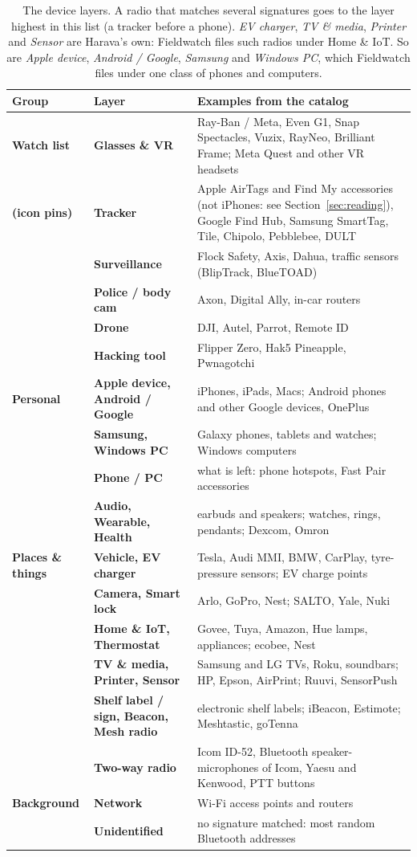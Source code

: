 \documentclass[10pt,a4paper]{article}
\begin{document}
\begin{table}[H]\small\centering
\begin{tabularx}{\textwidth}{>{\bfseries}p{2.4cm}>{\bfseries}p{2.9cm}X}
\toprule
Group & Layer & Examples from the catalog\\
\midrule
Watch list & Glasses \& VR & Ray-Ban / Meta, Even G1, Snap Spectacles, Vuzix, RayNeo, Brilliant Frame; Meta Quest and other VR headsets\\
(icon pins) & Tracker & Apple AirTags and Find My accessories (not iPhones: see Section~\ref{sec:reading}), Google Find Hub, Samsung SmartTag, Tile, Chipolo, Pebblebee, DULT\\
 & Surveillance & Flock Safety, Axis, Dahua, traffic sensors (BlipTrack, BlueTOAD)\\
 & Police / body cam & Axon, Digital Ally, in-car routers\\
 & Drone & DJI, Autel, Parrot, Remote ID\\
 & Hacking tool & Flipper Zero, Hak5 Pineapple, Pwnagotchi\\
\midrule
Personal & Apple device, Android / Google & iPhones, iPads, Macs; Android phones and other Google devices, OnePlus\\
 & Samsung, Windows PC & Galaxy phones, tablets and watches; Windows computers\\
 & Phone / PC & what is left: phone hotspots, Fast Pair accessories\\
 & Audio, Wearable, Health & earbuds and speakers; watches, rings, pendants; Dexcom, Omron\\
\midrule
Places \& things & Vehicle, EV charger & Tesla, Audi MMI, BMW, CarPlay, tyre-pressure sensors; EV charge points\\
 & Camera, Smart lock & Arlo, GoPro, Nest; SALTO, Yale, Nuki\\
 & Home \& IoT, Thermostat & Govee, Tuya, Amazon, Hue lamps, appliances; ecobee, Nest\\
 & TV \& media, Printer, Sensor & Samsung and LG TVs, Roku, soundbars; HP, Epson, AirPrint; Ruuvi, SensorPush\\
 & Shelf label / sign, Beacon, Mesh radio & electronic shelf labels; iBeacon, Estimote; Meshtastic, goTenna\\
 & Two-way radio & Icom ID-52, Bluetooth speaker-microphones of Icom, Yaesu and Kenwood, PTT buttons\\
\midrule
Background & Network & Wi-Fi access points and routers\\
 & Unidentified & no signature matched: most random Bluetooth addresses\\
\bottomrule
\end{tabularx}
\caption{The device layers. A radio that matches several signatures goes to the layer highest in this list (a tracker before a phone). \emph{EV charger}, \emph{TV \& media}, \emph{Printer} and \emph{Sensor} are Harava's own: Fieldwatch files such radios under Home \& IoT. So are \emph{Apple device}, \emph{Android / Google}, \emph{Samsung} and \emph{Windows PC}, which Fieldwatch files under one class of phones and computers.}
\end{table}
\end{document}
